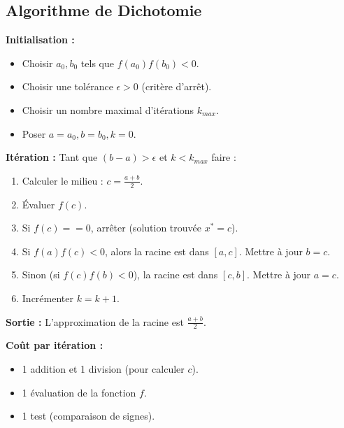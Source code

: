 \documentclass{article}
\begin{document}
\subsection{Algorithme de Dichotomie} %
\textbf{Initialisation :}
\begin{itemize}
    \item Choisir $a_0, b_0$ tels que $f(a_0)f(b_0) < 0$.
    \item Choisir une tolérance $\epsilon > 0$ (critère d'arrêt).
    \item Choisir un nombre maximal d'itérations $k_{max}$.
    \item Poser $a = a_0, b = b_0, k = 0$.
\end{itemize}
\textbf{Itération :}
Tant que $(b-a) > \epsilon$ et $k < k_{max}$ faire :
\begin{enumerate}
    \item Calculer le milieu : $c = \frac{a+b}{2}$.
    \item Évaluer $f(c)$.
    \item Si $f(c) == 0$, arrêter (solution trouvée $x^*=c$).
    \item Si $f(a)f(c) < 0$, alors la racine est dans $[a, c]$. Mettre à jour $b=c$.
    \item Sinon (si $f(c)f(b) < 0$), la racine est dans $[c, b]$. Mettre à jour $a=c$.
    \item Incrémenter $k = k+1$.
\end{enumerate}
\textbf{Sortie :} L'approximation de la racine est $\frac{a+b}{2}$.

\textbf{Coût par itération :}
\begin{itemize}
    \item 1 addition et 1 division (pour calculer $c$).
    \item 1 évaluation de la fonction $f$.
    \item 1 test (comparaison de signes).
\end{itemize}
\end{document}
